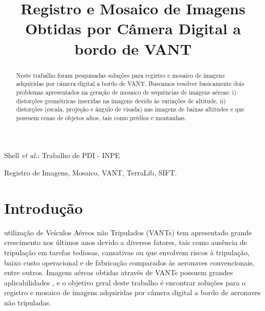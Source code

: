 \documentclass[9pt, a4paper, nofonttune, journal]{IEEEtran}
\begin{document}
\title{Registro e Mosaico de Imagens \\Obtidas por Câmera Digital a bordo de VANT}

\author{
}

%
{Shell \MakeLowercase{\textit{et al.}}: Trabalho de PDI - INPE}

\maketitle

\begin{abstract}
Neste trabalho foram pesquisadas soluções para registro e mosaico de imagens adquiridas por câmera digital a bordo de VANT. Buscamos resolver basicamente dois problemas apresentados na geração de mosaico de sequências de imagens aéreas: i) distorções geométricas inseridas na imagens devido às variações de altitude, ii) distorções (escala, projeção e ângulo de visada) nas imagens de baixas altitudes e que possuem cenas de objetos altos, tais como prédios e montanhas.
\end{abstract}

\begin{IEEEkeywords}
Registro de Imagens, Mosaico, VANT, TerraLib, SIFT.
\end{IEEEkeywords}

\section{Introdução}
 utilização de Veículos Aéreos não Tripulados (VANTs) tem apresentado grande crescimento nos últimos anos devido a diversos fatores, tais como ausência de tripulação em tarefas tediosas, cansativas ou que envolvem riscos à tripulação, baixo custo operacional e de fabricação comparados às aeronaves convencionais, entre outros. Imagens aéreas obtidas através de VANTs possuem grandes aplicabilidades \cite{canhoto}, e o objetivo geral deste trabalho é encontrar soluções para o registro e mosaico de imagens adquiridas por câmera digital a bordo de aeronaves não tripuladas.
\end{document}
